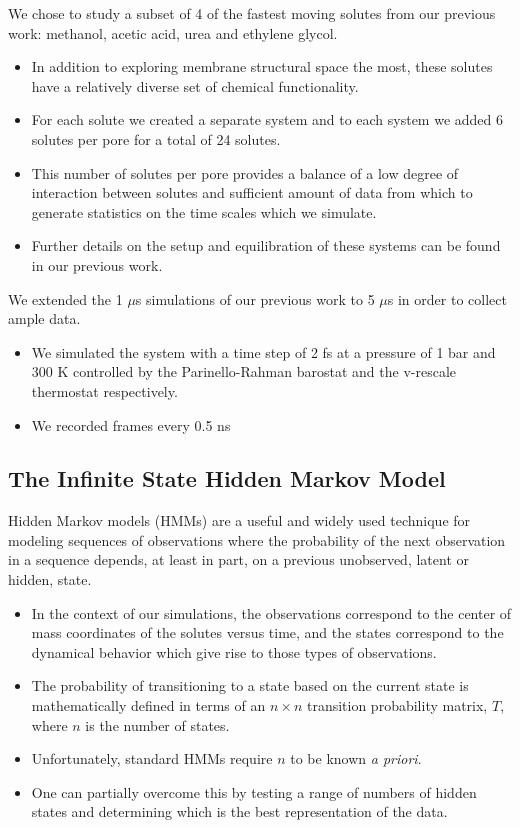 \documentclass{article}
\begin{document}
  We chose to study a subset of 4 of the fastest moving solutes from our previous
  work: methanol, acetic acid, urea and ethylene glycol.
  \begin{itemize} 
    \item In addition to exploring membrane structural space the most, these solutes
    have a relatively diverse set of chemical functionality.   
    \item For each solute we created a separate system and to each system we
    added 6 solutes per pore for a total of 24 solutes.
    \item This number of solutes per pore provides a balance of a low 
    degree of interaction between solutes and sufficient amount of data from
    which to generate statistics on the time scales which we simulate.
    \item Further details on the setup and equilibration of these systems can
    be found in our previous work.\cite{coscia_chemically_2019}
  \end{itemize}
  
  \noindent We extended the 1 $\mu$s simulations of our previous work to 5 $\mu$s in order
  to collect ample data.
  \begin{itemize}
    \item We simulated the system with a time step of 2 fs at a pressure of 1 bar
    and 300 K controlled by the Parinello-Rahman barostat and the v-rescale thermostat
    respectively.
    \item We recorded frames every 0.5 ns
  \end{itemize}

  \subsection{The Infinite State Hidden Markov Model}\label{method:IHMM}
  
  Hidden Markov models (HMMs) are a useful and widely used technique
  for modeling sequences of observations where the probability of the next observation
  in a sequence depends, at least in part, on a previous unobserved, latent or hidden, state.~\cite{beal_infinite_2002}
  \begin{itemize}
    \item In the context of our simulations, the observations correspond to 
    the center of mass coordinates of the solutes versus time, and the states
    correspond to the dynamical behavior which give rise to those types
    of observations.
    \item The probability of transitioning to a state based on the current
    state is mathematically defined in terms of an $n\times n$ transition
    probability matrix, $T$, where $n$ is the number of states.
    \item Unfortunately, standard HMMs require $n$ to be known
    \textit{a priori}.
    \item One can partially overcome this by testing a range of numbers of 
    hidden states and determining which is the best representation of the
    data.
  \end{itemize}
  
\end{document}
